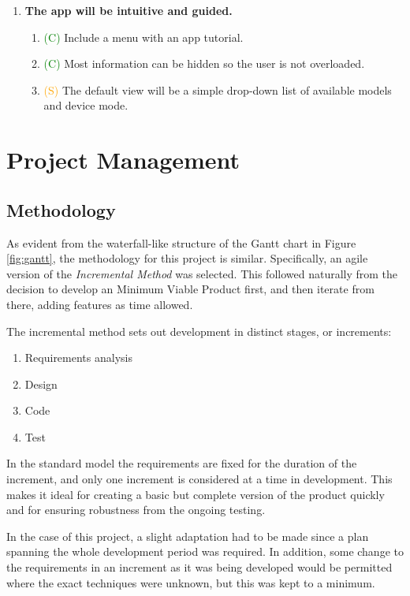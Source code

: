 \documentclass[12pt, a4paper]{article}
\newcommand{\should}[1]{\textcolor{orange}{#1}}
\newcommand{\could}[1]{\textcolor{green}{#1}}
\begin{document}
\begin{enumerate}[label=\Roman*.]
\item \textbf{The app will be intuitive and guided.}
    \begin{enumerate}[label=\arabic*.]
    \item \could{(C)} Include a menu with an app tutorial.
    \item \could{(C)} Most information can be hidden so the user is not overloaded.
    \item \should{(S)} The default view will be a simple drop-down list of available models and device mode.
    \end{enumerate}
\end{enumerate}

\newpage
\section{Project Management}

\subsection{Methodology}
\label{methodology}
As evident from the waterfall-like structure of the Gantt chart in Figure \ref{fig:gantt}, the methodology for this project is similar. Specifically, an agile version of the \textit{Incremental Method} \cite{management:incremental} was selected. This followed naturally from the decision to develop an Minimum Viable Product first, and then iterate from there, adding features as time allowed. 

The incremental method sets out development in distinct stages, or increments:
\begin{enumerate}
    \item Requirements analysis
    \item Design
    \item Code 
    \item Test
\end{enumerate}
In the standard model the requirements are fixed for the duration of the increment, and only one increment is considered at a time in development. This makes it ideal for creating a basic but complete version of the product quickly and for ensuring robustness from the ongoing testing. 

In the case of this project, a slight adaptation had to be made since a plan spanning the whole development period was required. In addition, some change to the requirements in an increment as it was being developed would be permitted where the exact techniques were unknown, but this was kept to a minimum.  
\end{document}
